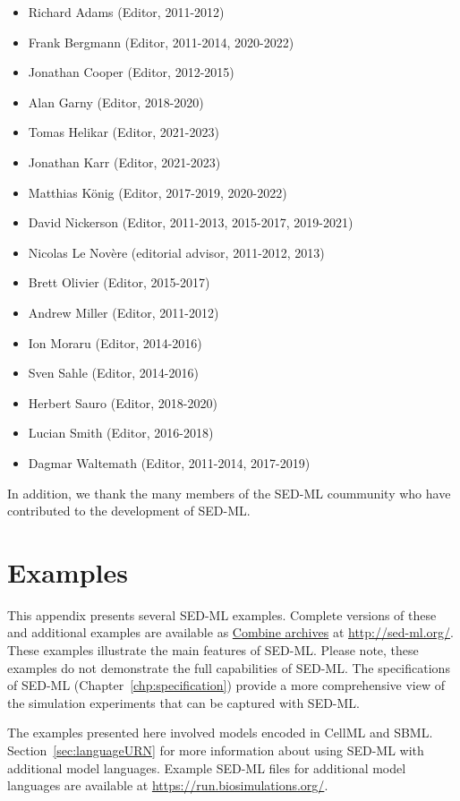 \documentclass[pdftex,rgb,dvipsnames,svgnames,hyperref,table]{report}
\begin{document}
\begin{itemize}
\item Richard Adams (Editor, 2011-2012)
\item Frank Bergmann (Editor, 2011-2014, 2020-2022)
\item Jonathan Cooper (Editor, 2012-2015)
\item Alan Garny (Editor, 2018-2020)
\item Tomas Helikar (Editor, 2021-2023)
\item Jonathan Karr (Editor, 2021-2023)
\item Matthias K\"{o}nig (Editor, 2017-2019, 2020-2022)
\item David Nickerson (Editor, 2011-2013, 2015-2017, 2019-2021)
\item Nicolas Le Nov{\`e}re (editorial advisor, 2011-2012, 2013)
\item Brett Olivier (Editor, 2015-2017)
\item Andrew Miller (Editor, 2011-2012)
\item Ion Moraru (Editor, 2014-2016)
\item Sven Sahle (Editor, 2014-2016)
\item Herbert Sauro (Editor, 2018-2020)
\item Lucian Smith (Editor, 2016-2018)
\item Dagmar Waltemath (Editor, 2011-2014, 2017-2019)
\end{itemize}

In addition, we thank the many members of the SED-ML coummunity who have contributed to the development of SED-ML.

\appendix

\chapter{Examples}
\label{app:examples}
This appendix presents several SED-ML examples. Complete versions of these and additional examples are available as \hyperref[sec:archive]{Combine archives} at \url{http://sed-ml.org/}. These examples illustrate the main features of SED-ML. Please note, these examples do not demonstrate the full capabilities of SED-ML. The specifications of SED-ML (Chapter~\ref{chp:specification}) provide a more comprehensive view of the simulation experiments that can be captured with SED-ML. 

The examples presented here involved models encoded in CellML and SBML.  Section~\ref{sec:languageURN} for more information about using SED-ML with additional model languages. Example SED-ML files for additional model languages are available at \url{https://run.biosimulations.org/}.
\end{document}
